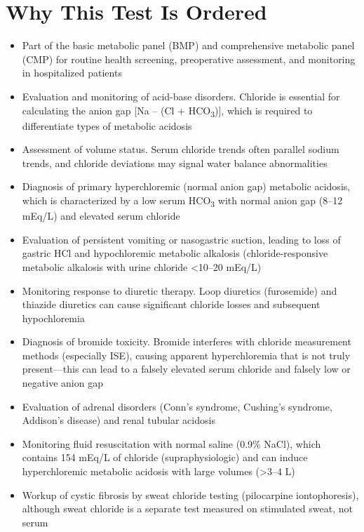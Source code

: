 \section*{Why This Test Is Ordered}
\begin{itemize}
  \item Part of the basic metabolic panel (BMP) and comprehensive metabolic panel (CMP) for routine health screening, preoperative assessment, and monitoring in hospitalized patients
  \item Evaluation and monitoring of acid-base disorders. Chloride is essential for calculating the anion gap [Na -- (Cl + HCO\textsubscript{3})], which is required to differentiate types of metabolic acidosis \cite{kraut2007serum}
  \item Assessment of volume status. Serum chloride trends often parallel sodium trends, and chloride deviations may signal water balance abnormalities
  \item Diagnosis of primary hyperchloremic (normal anion gap) metabolic acidosis, which is characterized by a low serum HCO\textsubscript{3} with normal anion gap (8--12 mEq/L) and elevated serum chloride
  \item Evaluation of persistent vomiting or nasogastric suction, leading to loss of gastric HCl and hypochloremic metabolic alkalosis (chloride-responsive metabolic alkalosis with urine chloride <10--20 mEq/L)
  \item Monitoring response to diuretic therapy. Loop diuretics (furosemide) and thiazide diuretics can cause significant chloride losses and subsequent hypochloremia
  \item Diagnosis of bromide toxicity. Bromide interferes with chloride measurement methods (especially ISE), causing apparent hyperchloremia that is not truly present---this can lead to a falsely elevated serum chloride and falsely low or negative anion gap
  \item Evaluation of adrenal disorders (Conn's syndrome, Cushing's syndrome, Addison's disease) and renal tubular acidosis
  \item Monitoring fluid resuscitation with normal saline (0.9\% NaCl), which contains 154 mEq/L of chloride (supraphysiologic) and can induce hyperchloremic metabolic acidosis with large volumes (>3--4 L)
  \item Workup of cystic fibrosis by sweat chloride testing (pilocarpine iontophoresis), although sweat chloride is a separate test measured on stimulated sweat, not serum
\end{itemize}


